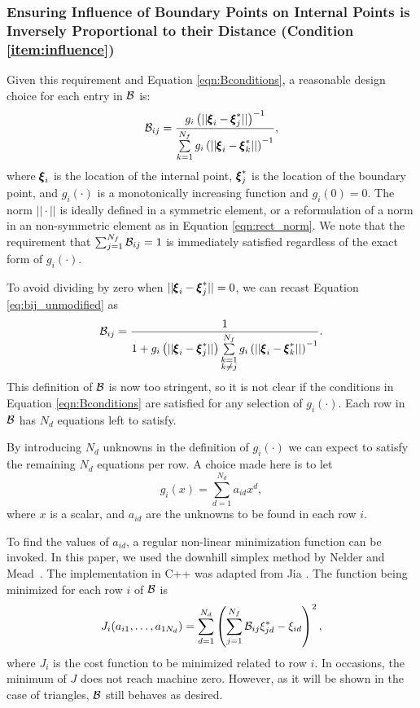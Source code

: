 \subsubsection{Ensuring Influence of Boundary Points on Internal Points is Inversely Proportional to their Distance (Condition \ref{item:influence})}
Given this requirement and Equation \eqref{eqn:Bconditions}, a reasonable design choice for each entry in $\mathcal{B}$ is:
\begin{equation}
\label{eq:bij_unmodified}
\mathcal{B}_{ij} = \frac{g_i\left(||{\pmb \xi}_i - {\pmb \xi}_j^*|| \right)^{-1}}{\sum\limits_{k=1}^{N_f}g_i\left(||{\pmb \xi}_i - {\pmb \xi}_k^*|| \right)^{-1}},
\end{equation}
where ${\pmb \xi}_i$ is the location of the \ith internal point, ${\pmb \xi}_j^*$ is the location of the \jth boundary point, and $g_i(\cdot)$ is a monotonically increasing function and $g_i(0) = 0$. The norm $||\cdot||$ is ideally defined in a symmetric element, or a reformulation of a norm in an non-symmetric element as in Equation \eqref{eqn:rect_norm}. We note that the requirement that $\sum_{j = 1}^{N_f} \mathcal{B}_{ij} = 1$ is immediately satisfied regardless of the exact form of $g_i(\cdot)$.

To avoid dividing by zero when $||{\pmb \xi}_i - {\pmb \xi}_j^*|| = 0$, we can recast Equation \eqref{eq:bij_unmodified} as
\begin{equation}
\label{eq:bij_def}
\mathcal{B}_{ij} = \frac{1}{1 + g_i\left(||{\pmb \xi}_i - {\pmb \xi}_j^*|| \right)\sum\limits_{\substack{k=1\\k \ne j}}^{N_f}g_i\left(||{\pmb \xi}_i - {\pmb \xi}_k^*|| \right)^{-1}}.
\end{equation}
This definition of $\mathcal{B}$ is now too stringent, so it is not clear if the conditions in Equation \eqref{eqn:Bconditions} are satisfied for any selection of $g_i(\cdot)$. Each row in $\mathcal{B}$ has $N_d$ equations left to satisfy.

By introducing $N_d$ unknowns in the definition of $g_i(\cdot)$ we can expect to satisfy the remaining $N_d$ equations per row. A choice made here is to let
\begin{equation}
\label{eqn:g_def}
g_i(x) = \sum_{d = 1}^{N_d} a_{id} x^d,
\end{equation}
where $x$ is a scalar, and $a_{id}$ are the unknowns to be found in each row $i$.

To find the values of $a_{id}$, a regular non-linear minimization function can be invoked. In this paper, we used the downhill simplex method by Nelder and Mead~\cite{nelder1965simplex}. The implementation in C++ was adapted from Jia \cite{simplexCode}. The function being minimized for each row $i$ of $\mathcal{B}$ is
\begin{equation}
J_i(a_{i1},\dots,a_{1N_d})=\sum_{d=1}^{N_d}\left(\sum_{j=1}^{N_f}\mathcal{B}_{ij}\xi^*_{jd} - \xi_{id}\right)^2,
\end{equation}
where $J_i$ is the cost function to be minimized related to row $i$. In occasions, the minimum of $J$ does not reach machine zero. However, as it will be shown in the case of triangles, $\mathcal{B}$ still behaves as desired.

